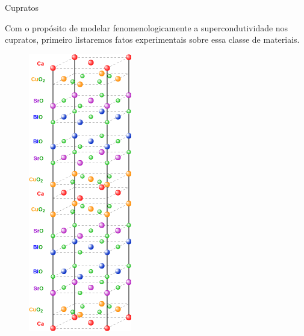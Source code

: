 \documentclass[a4paper,10pt]{article}
\begin{document}
\begin{section}{Cupratos} \label{sec:cupratos}

Com o propósito de modelar fenomenologicamente a supercondutividade nos cupratos, primeiro listaremos fatos experimentais sobre essa classe de materiais.

\begin{minipage}{0.25\textwidth}
\begin{figure}[H]
\centering
\includegraphics[width=\textwidth]{fig/bscco-unitcell.png}

\end{figure}
\end{minipage}
\end{section}
\end{document}
